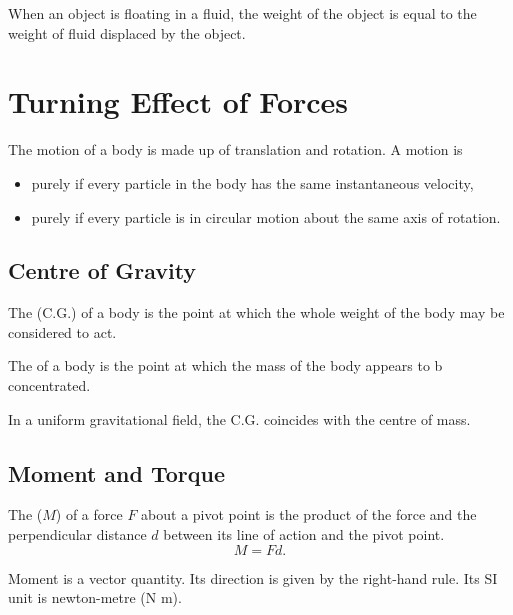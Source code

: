 \begin{principle}
    When an object is floating in a fluid, the weight of the object is equal to the weight of fluid displaced by the object.
\end{principle}

\section{Turning Effect of Forces}

The motion of a body is made up of translation and rotation. A motion is
\begin{itemize}
    \item purely  if every particle in the body has the same instantaneous velocity,
    \item purely  if every particle is in circular motion about the same axis of rotation.
\end{itemize}

\subsection{Centre of Gravity}

\begin{definition}
    The  (C.G.) of a body is the point at which the whole weight of the body may be considered to act.
\end{definition}

\begin{definition}
    The  of a body is the point at which the mass of the body appears to b concentrated.
\end{definition}

In a uniform gravitational field, the C.G. coincides with the centre of mass.

\subsection{Moment and Torque}

\begin{definition}
    The  ($M$) of a force $F$ about a pivot point is the product of the force and the perpendicular distance $d$ between its line of action and the pivot point. \[M = F d.\]
\end{definition}

Moment is a vector quantity. Its direction is given by the right-hand rule. Its SI unit is newton-metre (N m).

